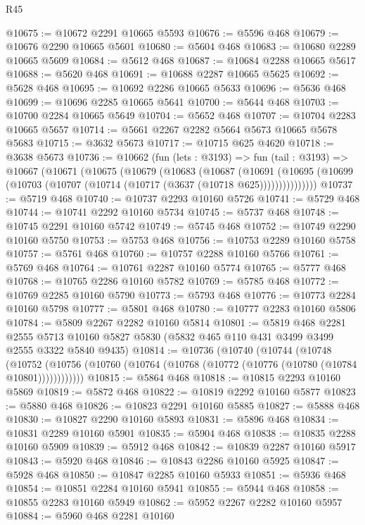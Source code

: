 \begin{lexlean}{R45}
\begin{coremodule}
@10675 := @10672 @2291 @10665 @5593
@10676 := @5596 @468
@10679 := @10676 @2290 @10665 @5601
@10680 := @5604 @468
@10683 := @10680 @2289 @10665 @5609
@10684 := @5612 @468
@10687 := @10684 @2288 @10665 @5617
@10688 := @5620 @468
@10691 := @10688 @2287 @10665 @5625
@10692 := @5628 @468
@10695 := @10692 @2286 @10665 @5633
@10696 := @5636 @468
@10699 := @10696 @2285 @10665 @5641
@10700 := @5644 @468
@10703 := @10700 @2284 @10665 @5649
@10704 := @5652 @468
@10707 := @10704 @2283 @10665 @5657
@10714 := @5661 @2267 @2282 @5664 @5673 @10665 @5678 @5683
@10715 := @3632 @5673
@10717 := @10715 @625 @4620
@10718 := @3638 @5673
@10736 := @10662
    (fun (lets : @3193) =>
    fun (tail : @3193) =>
    @10667
      (@10671
        (@10675
          (@10679
            (@10683
              (@10687
                (@10691
                  (@10695 (@10699 (@10703 (@10707 (@10714 (@10717 (@3637 (@10718 @625)))))))))))))))
@10737 := @5719 @468
@10740 := @10737 @2293 @10160 @5726
@10741 := @5729 @468
@10744 := @10741 @2292 @10160 @5734
@10745 := @5737 @468
@10748 := @10745 @2291 @10160 @5742
@10749 := @5745 @468
@10752 := @10749 @2290 @10160 @5750
@10753 := @5753 @468
@10756 := @10753 @2289 @10160 @5758
@10757 := @5761 @468
@10760 := @10757 @2288 @10160 @5766
@10761 := @5769 @468
@10764 := @10761 @2287 @10160 @5774
@10765 := @5777 @468
@10768 := @10765 @2286 @10160 @5782
@10769 := @5785 @468
@10772 := @10769 @2285 @10160 @5790
@10773 := @5793 @468
@10776 := @10773 @2284 @10160 @5798
@10777 := @5801 @468
@10780 := @10777 @2283 @10160 @5806
@10784 := @5809 @2267 @2282 @10160 @5814
@10801 := @5819
    @468
    @2281
    @2555
    @5713
    @10160
    @5827
    @5830
    (@5832 @465 @110 @431 @3499 @3499 @2555 @3322 @5840 @9435)
@10814 := @10736
    (@10740
      (@10744
        (@10748
          (@10752 (@10756 (@10760 (@10764 (@10768 (@10772 (@10776 (@10780 (@10784 @10801))))))))))))
@10815 := @5864 @468
@10818 := @10815 @2293 @10160 @5869
@10819 := @5872 @468
@10822 := @10819 @2292 @10160 @5877
@10823 := @5880 @468
@10826 := @10823 @2291 @10160 @5885
@10827 := @5888 @468
@10830 := @10827 @2290 @10160 @5893
@10831 := @5896 @468
@10834 := @10831 @2289 @10160 @5901
@10835 := @5904 @468
@10838 := @10835 @2288 @10160 @5909
@10839 := @5912 @468
@10842 := @10839 @2287 @10160 @5917
@10843 := @5920 @468
@10846 := @10843 @2286 @10160 @5925
@10847 := @5928 @468
@10850 := @10847 @2285 @10160 @5933
@10851 := @5936 @468
@10854 := @10851 @2284 @10160 @5941
@10855 := @5944 @468
@10858 := @10855 @2283 @10160 @5949
@10862 := @5952 @2267 @2282 @10160 @5957
@10884 := @5960
    @468
    @2281
    @10160

\end{coremodule}
\end{lexlean}
